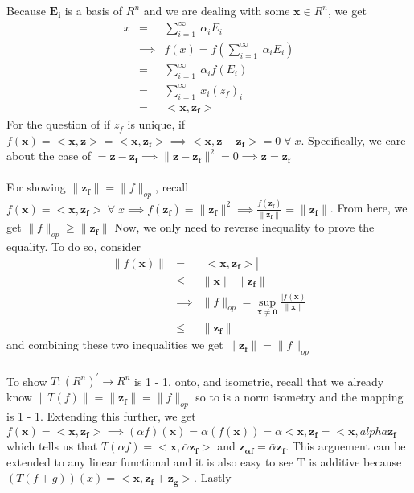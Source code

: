 \documentclass[11pt]{SelfArxOneColBMN}
\begin{document}
\begin{solution}
  Because $\mathbf{E_i}$ is a basis of $R^n$ and we are dealing with some $\mathbf{x} \in R^n$, we get
  \begin{eqnarray*}
    x &=& \sum_{i=1}^\infty\:\alpha_iE_i\\
    &\implies& f(x) = f(\sum_{i=1}^\infty\:\alpha_iE_i)\\
    &=& \sum_{i=1}^\infty\:\alpha_if(E_i)\\
    &=& \sum_{i=1}^\infty\:x_i(z_f)_i\\
    &=& <\mathbf{x},\mathbf{z_f}>
  \end{eqnarray*}
  For the question of if $z_f$ is unique, if $f(\mathbf{x}) = <\mathbf{x},\mathbf{z}> = <\mathbf{x},\mathbf{z_f}> \implies <\mathbf{x},\mathbf{z} - \mathbf{z_f}> = 0 \; \forall \; x$. Specifically, we care about the case of $ = \mathbf{z} - \mathbf{z_f} \implies \|\mathbf{z} - \mathbf{z_f}\|^2 = 0 \implies \mathbf{z} = \mathbf{z_f}$\\
  \\
  For showing $\|\mathbf{z_f}\| = \|f\|_{op}$, recall $f(\mathbf{x}) = <\mathbf{x},\mathbf{z_f}> \; \forall \; x \implies f(\mathbf{z_f}) = \|\mathbf{z_f}\|^2 \implies \frac{f(\mathbf{z_f})}{\|\mathbf{z_f}\|} = \|\mathbf{z_f}\|$. From here, we get $\|f\|_{op} \geq \|\mathbf{z_f}\|$ Now, we only need to reverse inequality to prove the equality. To do so, consider
  \begin{eqnarray*}
    \|f(\mathbf{x})\| &=& |<\mathbf{x},\mathbf{z_f}>|\\
    &\leq& \|\mathbf{x}\|\;\|\mathbf{z_f}\|\\
    &\implies& \|f\|_{op} = \sup_{\mathbf{x \neq 0}}\frac{|f(\mathbf{x})}{\|\mathbf{x}\|}\\
    &\leq& \|\mathbf{z_f}\|
  \end{eqnarray*}
  and combining these two inequalities we get $\|\mathbf{z_f}\| = \|f\|_{op}$\\
  \\
  To show $T: (R^n)^\prime \rightarrow R^n$ is 1 - 1, onto, and isometric, recall that we already know $\|T(f)\| = \|\mathbf{z_f}\| = \|f\|_{op}$ so to is a norm isometry and the mapping is 1 - 1. Extending this further, we get $f(\mathbf{x}) = <\mathbf{x},\mathbf{z_f}> \implies (\alpha f)(\mathbf{x}) = \alpha(f(\mathbf{x})) = \alpha <\mathbf{x},\mathbf{z_f} = <\mathbf{x},\bar{alpha}\mathbf{z_f}$ which tells us that $T(\alpha f) = <\mathbf{x},\bar{\alpha}\mathbf{z_f}>$ and $\mathbf{z_{\alpha f}} = \bar{\alpha}\mathbf{z_f}$. This arguement can be extended to any linear functional and it is also easy to see T is additive because $(T(f + g))(x) = <\mathbf{x},\mathbf{z_f}+\mathbf{z_g}>$. Lastly

\end{solution}
\end{document}
